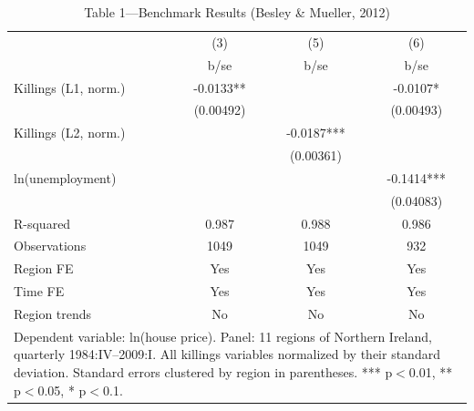 \begin{table}[htbp]\centering
\def\sym#1{\ifmmode^{#1}\else\(^{#1}\)\fi}
\caption{Table 1---Benchmark Results (Besley \& Mueller, 2012)}
\begin{tabular}{l*{3}{c}}
\toprule
            &\multicolumn{1}{c}{(3)}&\multicolumn{1}{c}{(5)}&\multicolumn{1}{c}{(6)}\\
            &        b/se   &        b/se   &        b/se   \\
\midrule
Killings (L1, norm.)&     -0.0133** &               &     -0.0107*  \\
            &   (0.00492)   &               &   (0.00493)   \\
Killings (L2, norm.)&               &     -0.0187***&               \\
            &               &   (0.00361)   &               \\
ln(unemployment)&               &               &     -0.1414***\\
            &               &               &   (0.04083)   \\
\midrule
R-squared   &       0.987   &       0.988   &       0.986   \\
Observations&        1049   &        1049   &         932   \\
Region FE   &         Yes   &         Yes   &         Yes   \\
Time FE     &         Yes   &         Yes   &         Yes   \\
Region trends&          No   &          No   &          No   \\
\bottomrule
\multicolumn{4}{p{0.9\textwidth}}{\footnotesize Dependent variable: ln(house price).  Panel: 11 regions of Northern Ireland, quarterly 1984:IV--2009:I.  All killings variables normalized by their standard deviation.  Standard errors clustered by region in parentheses.  *** p$<$0.01, ** p$<$0.05, * p$<$0.1.}\\
\end{tabular}
\end{table}
